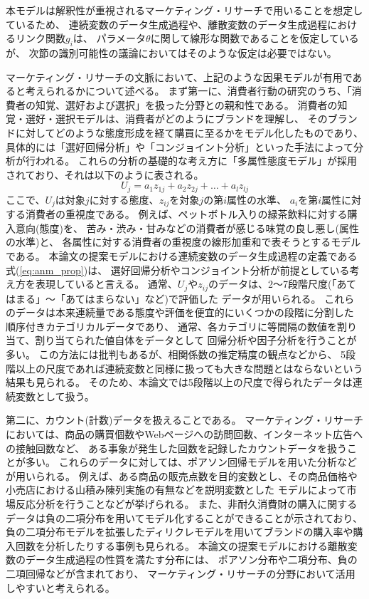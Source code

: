 本モデルは解釈性が重視されるマーケティング・リサーチで用いることを想定しているため、
連続変数のデータ生成過程や、離散変数のデータ生成過程におけるリンク関数$g_i$は、
パラメータ$\theta$に関して線形な関数であることを仮定しているが、
次節の識別可能性の議論においてはそのような仮定は必要ではない。

マーケティング・リサーチの文脈において、上記のような因果モデルが有用であると考えられるかについて述べる。
まず第一に、消費者行動の研究のうち、「消費者の知覚、選好および選択」を扱った分野との親和性である。
消費者の知覚・選好・選択モデルは、消費者がどのようにブランドを理解し、
そのブランドに対してどのような態度形成を経て購買に至るかをモデル化したものであり、
具体的には「選好回帰分析」や「コンジョイント分析」といった手法によって分析が行われる\cite{1987-vg}。
これらの分析の基礎的な考え方に「多属性態度モデル」が採用されており、それは以下のように表される。
\begin{equation}
  U_j = a_1 z_{1j} + a_2 z_{2j} + \dots + a_l z_{lj}
\end{equation}
ここで、$U_j$は対象$j$に対する態度、$z_{ij}$を対象$j$の第$i$属性の水準、
$a_i$を第$i$属性に対する消費者の重視度である。
例えば、ペットボトル入りの緑茶飲料に対する購入意向(態度)を、
苦み・渋み・甘みなどの消費者が感じる味覚の良し悪し(属性の水準)と、
各属性に対する消費者の重視度の線形加重和で表そうとするモデルである。
本論文の提案モデルにおける連続変数のデータ生成過程の定義である式(\ref{eq:anm_prop})は、
選好回帰分析やコンジョイント分析が前提としている考え方を表現していると言える。
通常、$U_j$や$z_{ij}$のデータは、2〜7段階尺度(「あてはまる」〜「あてはまらない」など)で評価した
データが用いられる\cite{1987-vg}\cite{2018-ci}。
これらのデータは本来連続量である態度や評価を便宜的にいくつかの段階に分割した
順序付きカテゴリカルデータであり、
通常、各カテゴリに等間隔の数値を割り当て、割り当てられた値自体をデータとして
回帰分析や因子分析を行うことが多い。
この方法には批判もあるが、相関係数の推定精度の観点などから、
5段階以上の尺度であれば連続変数と同様に扱っても大きな問題とはならないという結果も見られる\cite{1996-bs}。
そのため、本論文では5段階以上の尺度で得られたデータは連続変数として扱う。

第二に、カウント(計数)データを扱えることである。
マーケティング・リサーチにおいては、商品の購買個数やWebページへの訪問回数、インターネット広告への接触回数など、
ある事象が発生した回数を記録したカウントデータを扱うことが多い。
これらのデータに対しては、ポアソン回帰モデルを用いた分析などが用いられる。
例えば、ある商品の販売点数を目的変数とし、その商品価格や小売店における山積み陳列実施の有無などを説明変数とした
モデルによって市場反応分析を行うことなどが挙げられる\cite{2015-pb}。
また、非耐久消費財の購入に関するデータは負の二項分布を用いてモデル化することができることが示されており\cite{Ehrenberg1959-ei}、
負の二項分布モデルを拡張したディリクレモデルを用いてブランドの購入率や購入回数を分析したりする事例も見られる\cite{2016-io}。
本論文の提案モデルにおける離散変数のデータ生成過程の性質を満たす分布には、
ポアソン分布や二項分布、負の二項回帰などが含まれており、
マーケティング・リサーチの分野において活用しやすいと考えられる。
